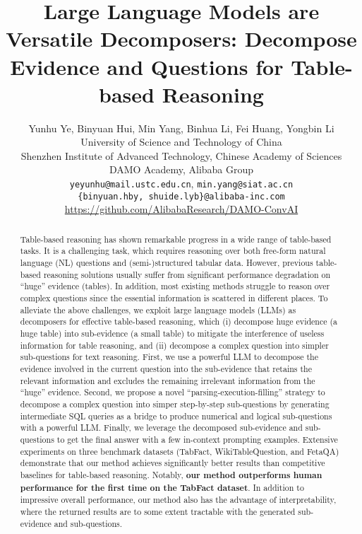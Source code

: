 \documentclass{article}
\title{Large Language Models are Versatile Decomposers: Decompose Evidence and Questions for Table-based Reasoning}
\author{
Yunhu Ye\footnotemark[3], Binyuan Hui, Min Yang\footnotemark[2], Binhua Li, Fei Huang, Yongbin Li\footnotemark[2] \\
 University of Science and Technology of China \\
 Shenzhen Institute of Advanced Technology, Chinese Academy of Sciences \\
 DAMO Academy, Alibaba Group \\
\texttt{yeyunhu@mail.ustc.edu.cn}, \texttt{min.yang@siat.ac.cn} \\
\texttt{\{binyuan.hby, shuide.lyb\}@alibaba-inc.com}\\
\url{https://github.com/AlibabaResearch/DAMO-ConvAI}
}
\begin{document}
\maketitle

\renewcommand{\thefootnote}{\fnsymbol{footnote}}

\begin{abstract}
Table-based reasoning has shown remarkable progress in a wide range of table-based tasks.
It is a challenging task, which requires reasoning over both free-form natural language (NL) questions and (semi-)structured tabular data. However, previous table-based reasoning solutions usually suffer from significant performance degradation on ``huge'' evidence (tables). In addition, most existing methods struggle to reason over complex questions since the essential information is scattered in different places. To alleviate the above challenges, we exploit large language models (LLMs) as decomposers for effective table-based reasoning, which (i) decompose huge evidence (a huge table) into sub-evidence (a small table) to mitigate the interference of useless information for table reasoning, and (ii) decompose a complex question into simpler sub-questions for text reasoning. First, we use a powerful LLM to decompose the evidence involved in the current question into the sub-evidence that retains the relevant information and excludes the remaining irrelevant information from the ``huge'' evidence. 
Second, we propose a novel ``parsing-execution-filling'' strategy to decompose a complex question into simper step-by-step sub-questions by generating intermediate SQL queries as a bridge to produce numerical and logical sub-questions with a powerful LLM.
Finally, we leverage the decomposed sub-evidence and sub-questions to get the final answer with a few in-context prompting examples. 
Extensive experiments on three benchmark datasets (TabFact, WikiTableQuestion, and FetaQA) demonstrate that our method achieves significantly better results than competitive baselines for table-based reasoning. 
Notably, \textbf{our method outperforms human performance for the first time on the TabFact dataset}. In addition to impressive overall performance, our method also has the advantage of interpretability, where the returned results are to some extent tractable with the generated sub-evidence and sub-questions.
\end{abstract}
\end{document}

